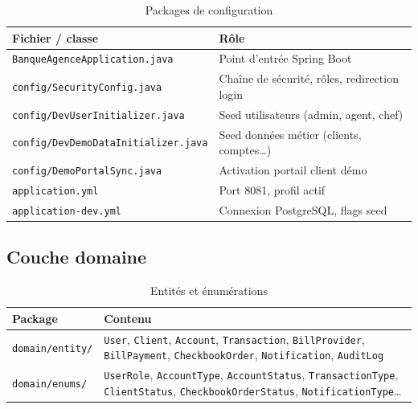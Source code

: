 \begin{table}[H]
    \centering
    \caption{Packages de configuration}
    \label{tab:config}
    \small
    \begin{tabular}{@{}lp{9cm}@{}}
        \toprule
        \textbf{Fichier / classe} & \textbf{Rôle} \\
        \midrule
        \texttt{BanqueAgenceApplication.java} & Point d'entrée Spring Boot \\
        \texttt{config/SecurityConfig.java} & Chaîne de sécurité, rôles, redirection login \\
        \texttt{config/DevUserInitializer.java} & Seed utilisateurs (admin, agent, chef) \\
        \texttt{config/DevDemoDataInitializer.java} & Seed données métier (clients, comptes…) \\
        \texttt{config/DemoPortalSync.java} & Activation portail client démo \\
        \texttt{application.yml} & Port 8081, profil actif \\
        \texttt{application-dev.yml} & Connexion PostgreSQL, flags seed \\
        \bottomrule
    \end{tabular}
\end{table}

\subsection{Couche domaine}

\begin{table}[H]
    \centering
    \caption{Entités et énumérations}
    \label{tab:domain}
    \small
    \begin{tabular}{@{}lp{9cm}@{}}
        \toprule
        \textbf{Package} & \textbf{Contenu} \\
        \midrule
        \texttt{domain/entity/} & \texttt{User}, \texttt{Client}, \texttt{Account}, \texttt{Transaction}, \texttt{BillProvider}, \texttt{BillPayment}, \texttt{CheckbookOrder}, \texttt{Notification}, \texttt{AuditLog} \\
        \texttt{domain/enums/} & \texttt{UserRole}, \texttt{AccountType}, \texttt{AccountStatus}, \texttt{TransactionType}, \texttt{ClientStatus}, \texttt{CheckbookOrderStatus}, \texttt{NotificationType}… \\
        \bottomrule
    \end{tabular}
\end{table}

